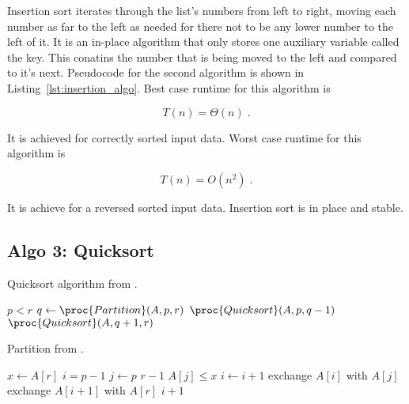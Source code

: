 Insertion sort iterates through the list’s numbers from left to right, moving each number as far to the left as needed for there not to be any lower number to the left of it. It is an in-place algorithm that only stores one auxiliary variable called the key. This conatins the number that is being moved to the left and compared to it’s next.
Pseudocode for the second algorithm is shown in
Listing~\ref{lst:insertion_algo}. Best case runtime for this algorithm
is

\begin{equation}
  T(n) = \Theta(n) \;.  \label{eq:ins_sort_best}
\end{equation}

It is achieved for correctly sorted input data. Worst case runtime for this algorithm is

\begin{equation}
  T(n) = O(n^2) \;.  \label{eq:ins_sort_worst}
\end{equation}

It is achieve for a reversed sorted input data. Insertion sort is in place and stable. 

\subsection{Algo 3: Quicksort}\label{sec:algo3}

\begin{algorithm}[H]
  \caption{Quicksort algorithm from \cite[Ch.~2.1]{cormen_introduction_2009}.}
  \label{lst:quicksort_algo}
  \begin{codebox}
    \li \If $p < r$
    \li \Then $q \gets \proc{Partition}(A, p, r)$
    \li     $\proc{Quicksort}(A, p, q - 1)$
    \li     $\proc{Quicksort}(A, q + 1, r)$
    \End
  \end{codebox}
\end{algorithm}

\begin{algorithm}[H]
  \caption{Partition from \cite[Ch.~2.1]{cormen_introduction_2009}.}
  \label{lst:partition}
  \begin{codebox}
    \li $x \gets A[r]$
    \li $i = p - 1$
    \li \For $j \gets p$ \To $r - 1$
    \li \Do \If $A[j] \le x$
    \li  	\Then $i \gets i + 1$
    \li     exchange $A[i]$ with $A[j]$
    \End
    \End
    \li exchange $A[i + 1]$ with $A[r]$
    \li \Return $i + 1$
  \end{codebox}
\end{algorithm}

